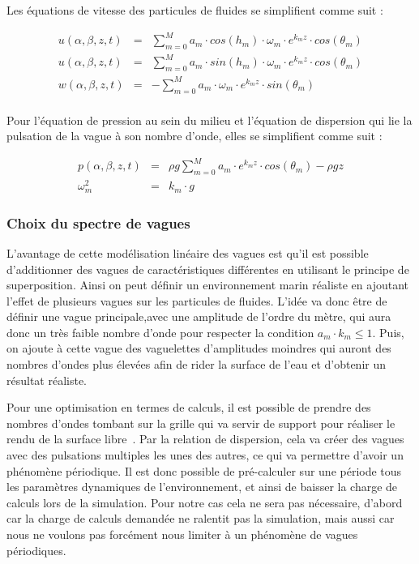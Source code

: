 				Les équations de vitesse des particules de fluides se simplifient comme suit :

				\begin{eqnarray}
					u(\alpha, \beta, z, t) & = & \sum_{m=0}^M a_m \cdot cos(h_m) \cdot \omega_m \cdot e^{k_mz} \cdot cos(\theta_m) \\
					u(\alpha, \beta, z, t) & = & \sum_{m=0}^M a_m \cdot sin(h_m) \cdot \omega_m \cdot e^{k_mz} \cdot cos(\theta_m) \\
					w(\alpha, \beta, z, t) & = & - \sum_{m=0}^M a_m \cdot \omega_m \cdot e^{k_mz} \cdot sin(\theta_m) \\
				\end{eqnarray}

				Pour l'équation de pression au sein du milieu et l'équation de dispersion qui lie la pulsation de la vague à son nombre d'onde, elles se simplifient comme suit :

				\begin{eqnarray}
					p(\alpha, \beta, z, t) & = & \rho g \sum_{m=0}^M a_m \cdot e^{k_mz} \cdot cos(\theta_m) - \rho g z\\
					\omega_m^2 & = & k_m \cdot g \label{equation:deep_dispersion}
				\end{eqnarray}

			\subsubsection{Choix du spectre de vagues}

				L'avantage de cette modélisation linéaire des vagues est qu'il est possible d'additionner des vagues de caractéristiques différentes en utilisant le principe de superposition. Ainsi on peut définir un environnement marin réaliste en ajoutant l'effet de plusieurs vagues sur les particules de fluides. L'idée va donc être de définir une vague principale,avec une amplitude de l'ordre du mètre, qui aura donc un très faible nombre d'onde pour respecter la condition $a_m \cdot k_m \le 1$. Puis, on ajoute à cette vague des vaguelettes d'amplitudes moindres qui auront des nombres d'ondes plus élevées afin de rider la surface de l'eau et d'obtenir un résultat réaliste.

				Pour une optimisation en termes de calculs, il est possible de prendre des nombres d'ondes tombant sur la grille qui va servir de support pour réaliser le rendu de la surface libre~\cite{tessendorf2001simulating}. Par la relation de dispersion, cela va créer des vagues avec des pulsations multiples les unes des autres, ce qui va permettre d'avoir un phénomène périodique. Il est donc possible de pré-calculer sur une période tous les paramètres dynamiques de l'environnement, et ainsi de baisser la charge de calculs lors de la simulation. Pour notre cas cela ne sera pas nécessaire, d'abord car la charge de calculs demandée ne ralentit pas la simulation, mais aussi car nous ne voulons pas forcément nous limiter à un phénomène de vagues périodiques.
			
